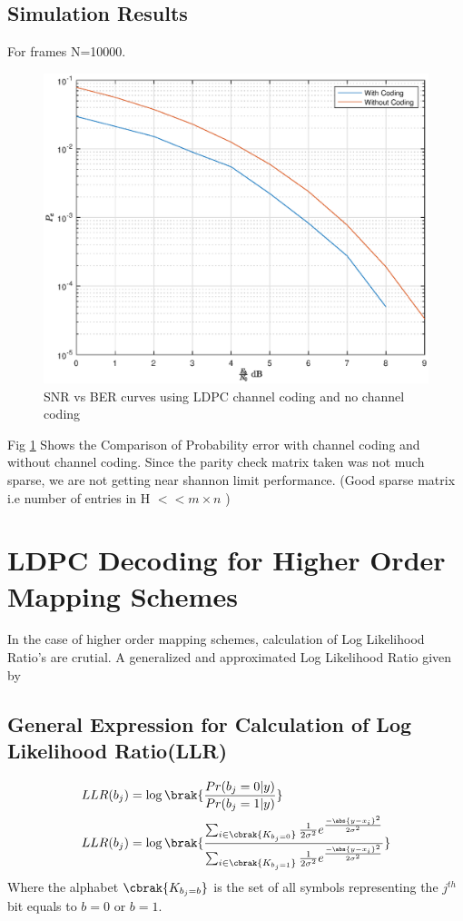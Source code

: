 \documentclass[journal,12pt,twocolumn]{IEEEtran}
\begin{document}
\subsection{Simulation Results}
For frames N=10000.
 \begin{figure}[!ht]
\begin{center}
\includegraphics[width=\columnwidth]{./figs/ber}
\caption{SNR vs BER curves using LDPC channel coding and no channel coding}
\label{fig : ber}
\end{center}
\end{figure}
Fig \ref{fig : ber} Shows the Comparison of Probability error with channel coding and without channel coding. Since the parity check matrix taken was not much sparse, we are not getting near shannon limit performance. (Good sparse matrix i.e number of entries in H $<< m\times n $ )

\section{LDPC Decoding for Higher Order Mapping Schemes}
In the case of higher order mapping schemes, calculation of Log Likelihood Ratio's are crutial. A generalized and approximated Log Likelihood Ratio given by \cite{llr}
\subsection{General Expression for Calculation of Log Likelihood Ratio(LLR)}
\begin{align}
LLR(b_j)&= \log \brak{\frac{Pr(b_j=0|y)}{Pr(b_j=1|y)}}\\
LLR(b_j)&=\log \brak{\frac{\sum_{i\in \cbrak{K_{b_j=0}}}\frac{1}{2\sigma^2}e^{\frac{-\abs{y-x_i}^2}{2\sigma^2}}}{\sum_{i\in \cbrak{K_{b_j=1}}}\frac{1}{2\sigma^2}e^{\frac{-\abs{y-x_i}^2}{2\sigma^2}}}}
\end{align}
Where the alphabet $\cbrak{K_{b_j=b}}$ is the set of all symbols representing the $j^{th}$ bit equals to $b=0$ or $b=1$.
\end{document}

